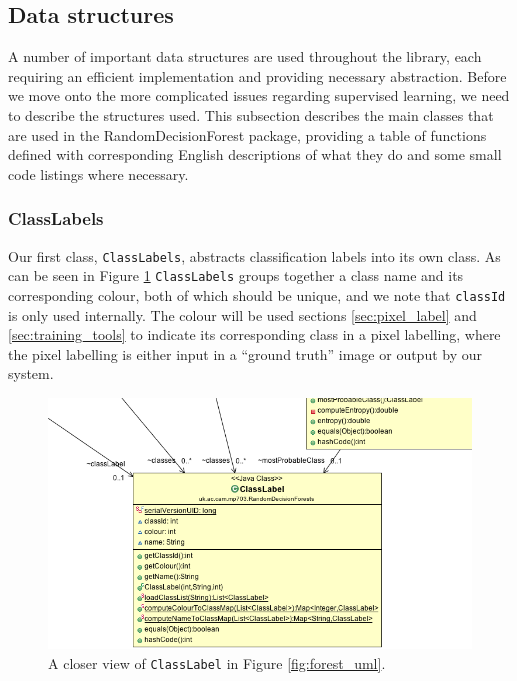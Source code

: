 \documentclass[12pt,twoside,notitlepage]{report}
\begin{document}
        \subsection{Data structures}
            A number of important data structures are used throughout the library, each requiring an efficient 
            implementation and providing necessary abstraction. Before we move onto the more complicated issues 
            regarding supervised learning, we need to describe the structures used. This subsection 
            describes the main classes that are used in the RandomDecisionForest package, providing a table of 
            functions defined with corresponding English descriptions of what they do and some small code listings 
            where necessary.



            \subsubsection{ClassLabels}
                Our first class, \texttt{ClassLabels}, abstracts classification labels into its own class. As can be 
                seen in Figure \ref{fig:class_label_uml} \texttt{ClassLabels} groups together a class name and its 
                corresponding colour, both of which should be unique, and we note that \texttt{classId} is only used 
                internally. The colour will be used sections 
                \ref{sec:pixel_label} and \ref{sec:training_tools} to indicate its corresponding class in a pixel 
                labelling, where the pixel labelling is either input in a ``ground truth'' image or output by our system.                

                \begin{figure}[H]
                    \centering
                    \includegraphics[scale=0.5]{ClassLabel_Forest_UML}
                    \caption[A closer view of \texttt{ClassLabel}]{A closer view of \texttt{ClassLabel} in Figure \ref{fig:forest_uml}.}
                    \label{fig:class_label_uml}
                \end{figure}
\end{document}
